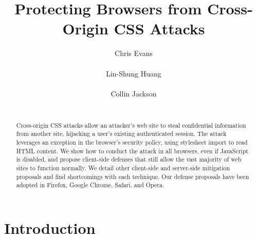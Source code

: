 \documentclass{acm_proc_article-sp}
\begin{document}
\title{Protecting Browsers from Cross-Origin CSS Attacks}
\author{
\alignauthor
Chris Evans\\
      \\
\alignauthor
Lin-Shung Huang\\
      \\
\alignauthor
Collin Jackson\\
      \\
}

\newcommand{\todo}[1]{\textbf{[TODO: #1]}}

\maketitle
\begin{abstract}
Cross-origin CSS attacks allow an attacker's web site to steal confidential information from another site, hijacking a user's existing authenticated session. The attack leverages an exception in the browser's security policy,
using stylesheet import to read HTML content. We show how to conduct the attack in all browsers, even if JavaScript is disabled, and propose client-side defenses that still allow the vast majority of web sites to function normally. We detail other client-side and server-side mitigation proposals and find shortcomings with each technique. Our defense proposals have been adopted in Firefox, Google Chrome, Safari, and Opera.
\end{abstract}




\section{Introduction}
\end{document}
